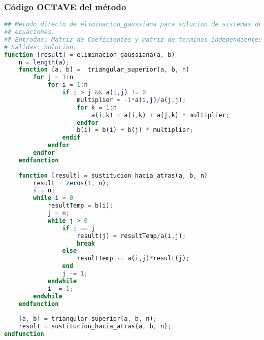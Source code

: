 \documentclass[12pt]{article}
\begin{document}
\subsubsection{Código OCTAVE del método}
\begin{lstlisting}[language=OCTAVE, caption=Implementación del método de Eliminación Gaussiana en Octave]
## Metodo directo de eliminacion_gaussiana para solucion de sistemas de 
## ecuaciones.
## Entradas: Matriz de Coeficientes y matriz de terminos independientes.
# Salidas: Solucion.
function [result] = eliminacion_gaussiana(a, b)
    n = length(a);
    function [a, b] =  triangular_superior(a, b, n)
        for j = 1:n
            for i = 1:n
                if i > j && a(i,j) != 0
                    multiplier = -1*a(i,j)/a(j,j);
                    for k = 1:n
                        a(i,k) = a(i,k) + a(j,k) * multiplier;
                    endfor
                    b(i) = b(i) + b(j) * multiplier;
                endif
            endfor
        endfor
    endfunction  
    
    function [result] = sustitucion_hacia_atras(a, b, n)
        result = zeros(1, n);
        i = n;
        while i > 0
            resultTemp = b(i);
            j = n;
            while j > 0
                if i == j
                    result(j) = resultTemp/a(i,j);
                    break
                else
                    resultTemp -= a(i,j)*result(j);
                end
                j -= 1;
            endwhile    
            i -= 1;
        endwhile
    endfunction
    
    [a, b] = triangular_superior(a, b, n);
    result = sustitucion_hacia_atras(a, b, n);
endfunction

\end{lstlisting}
\end{document}
